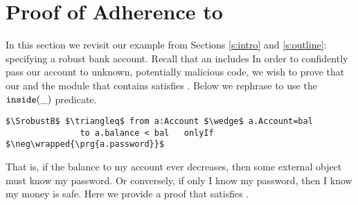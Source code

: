 \section{Proof of Adherence to \SrobustB}
\label{s:examples}
In this section we revisit our example from Sections \ref{s:intro} and \ref{s:outline}:
specifying a robust bank account. 
Recall that an  includes %
In order to confidently 
pass our account to unknown, potentially malicious code, we wish to prove that our 
 and the module that contains  satisfies \SrobustB. Below we rephrase 
\SrobustB to use the $\texttt{inside}( \_ )$ predicate.
\begin{lstlisting}[language=Chainmail, mathescape=true, frame=lines]
$\SrobustB$ $\triangleq$ from a:Account $\wedge$ a.Account=bal 
               to a.balance < bal   onlyIf $\neg\wrapped{\prg{a.password}}$
\end{lstlisting}
That is, if the balance to my account ever decreases, then some external
object must know my password. Or conversely, if only I know my password, then I know my money is safe. 
Here we provide a proof that \ModC satisfies \SrobustB. 



